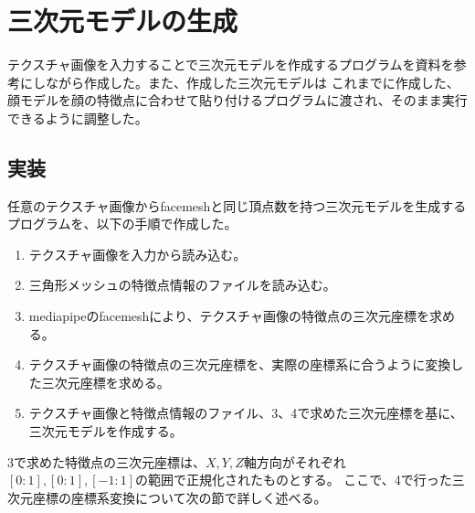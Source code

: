 \documentclass[]{jarticle}          %
\begin{document}
\newpage

\section{三次元モデルの生成}
テクスチャ画像を入力することで三次元モデルを作成するプログラムを資料\cite{bib_2}を参考にしながら作成した。また、作成した三次元モデルは
これまでに作成した、顔モデルを顔の特徴点に合わせて貼り付けるプログラムに渡され、そのまま実行できるように調整した。

\subsection{実装}
任意のテクスチャ画像からfacemeshと同じ頂点数を持つ三次元モデルを生成するプログラムを、以下の手順で作成した。
\begin{enumerate}
  \item テクスチャ画像を入力から読み込む。
  \item 三角形メッシュの特徴点情報のファイルを読み込む。
  \item mediapipeのfacemeshにより、テクスチャ画像の特徴点の三次元座標を求める。
  \item テクスチャ画像の特徴点の三次元座標を、実際の座標系に合うように変換した三次元座標を求める。
  \item テクスチャ画像と特徴点情報のファイル、3、4で求めた三次元座標を基に、三次元モデルを作成する。
\end{enumerate}
3で求めた特徴点の三次元座標は、$X,Y,Z$軸方向がそれぞれ$[0:1],[0:1],[-1:1]$の範囲で正規化されたものとする。
ここで、4で行った三次元座標の座標系変換について次の節で詳しく述べる。
\end{document}

